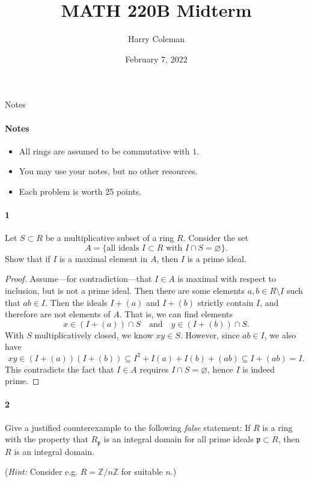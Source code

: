 \documentclass[12pt]{article}
\renewcommand{\maketitle}{\thispagestyle{title}}
\newlength{\myparskip}
\newenvironment{fullbox}{\begin{lrbox}{\savefullbox}\begin{minipage}{\dimexpr\textwidth-2\fboxsep\relax}\setlength{\parskip}{\myparskip}}{\end{minipage}\end{lrbox}\framebox[\textwidth]{\usebox{\savefullbox}}}
\newenvironment{pbox}[1][]{\begin{fullbox}\ifx#1\empty\else\paragraph{#1}\phantom{}\fi}{\end{fullbox}}
\theoremstyle{definition}
\newcommand{\isp}[1]{\quad\text{#1}\quad}
\newcommand{\Z}{\mathbb{Z}}
\renewcommand{\emptyset}{\varnothing}
\newcommand{\<}{\langle}
\renewcommand{\>}{\rangle}
\newcommand{\seq}{\subseteq}
\newcommand{\pp}{\mathfrak{p}}
\begin{document}
\title{MATH 220B Midterm}
\author{Harry Coleman}
\date{February 7, 2022}
\maketitle

\begin{pbox}[Notes]
    \begin{itemize}
        \item All rings are assumed to be commutative with $1$.
        \item You may use your notes, but no other resources.
        \item Each problem is worth 25 points.
    \end{itemize}
\end{pbox}

\begin{pbox}[1]
    Let $S\subset R$ be a multiplicative subset of a ring $R$.
    Consider the set
    \[
        A=\{\textrm{all ideals $I\subset R$ with $I\cap S=\emptyset$}\}.
    \]
    Show that if $I$ is a maximal element in $A$, then $I$ is a prime ideal.
\end{pbox}

\begin{proof}
    Assume---for contradiction---that $I \in A$ is maximal with respect to inclusion, but is not a prime ideal.
    Then there are some elements $a, b \in R \setminus I$ such that $ab \in I$.
    Then the ideals $I + (a)$ and $I + (b)$ strictly contain $I$, and therefore are not elements of $A$.
    That is, we can find elements
    \[
        x \in (I + (a)) \cap S \isp{and} y \in (I + (b)) \cap S.
    \]
    With $S$ multiplicatively closed, we know $xy \in S$.
    However, since $ab \in I$, we also have
    \[
        xy
            \in (I + (a))(I + (b))
            \seq I^2 + I(a) + I(b) + (ab)
            \seq I + (ab)
            = I.
    \]
    This contradicts the fact that $I \in A$ requires $I \cap S = \emptyset$, hence $I$ is indeed prime.
\end{proof}


 
\newpage
\begin{pbox}[2]
    Give a justified counterexample to the following \emph{false} statement: If $R$ is a ring with the property that $R_\pp$ is an integral domain for all prime ideals $\pp\subset R$, then $R$ is an integral domain.

    \noindent(\emph{Hint:} Consider e.g. $R=\Z/n\Z$ for suitable $n$.)
\end{pbox}
\end{document}
